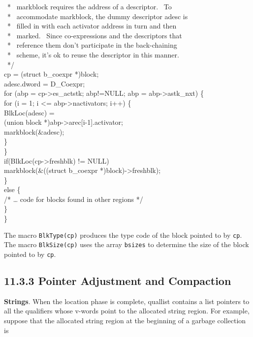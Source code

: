\begin{iconcode}
\>\>\ * \ markblock requires the address of a descriptor. \ To\\
\>\>\ * \ accommodate markblock, the dummy descriptor adesc is\\
\>\>\ * \ filled in with each activator address in turn and then\\
\>\>\ * \ marked. \ Since co-expressions and the descriptors that\\
\>\>\ * \ reference them don't participate in the back-chaining\\
\>\>\ * \ scheme, it's ok to reuse the descriptor in this manner.\\
\>\>\ */\\
\>\>cp = (struct b\_coexpr *)block;\\
\>\>adesc.dword = D\_Coexpr;\\
\>\>for (abp = cp->es\_actstk; abp!=NULL; abp = abp->astk\_nxt) \{\\
\>\>\>for (i = 1; i <= abp->nactivators; i++) \{\\
\>\>\>\>BlkLoc(adesc) =\\
\>\>\>\>\>(union block *)abp->arec[i-1].activator;\\
\>\>\>\>markblock(\&adesc);\\
\>\>\>\>\}\\
\>\>\>\}\\
\>\>if(BlkLoc(cp->freshblk) != NULL)\\
\>\>\>markblock(\&((struct b\_coexpr *)block)->freshblk);\\
\>\>\}\\
\>else \{\\
\>\>/* {\dots} code for blocks found in other regions */\\
\>\>\}\\
\>\}
\end{iconcode}

The macro \texttt{BlkType(cp)} produces the type code of the block
pointed to by \texttt{cp}. The macro \texttt{BlkSize(cp)} uses the
array \texttt{bsizes} to determine the size of the block pointed to by
\texttt{cp}.

\subsection[11.3.3 Pointer Adjustment and Compaction]{11.3.3 Pointer Adjustment and Compaction}

\textbf{Strings}. When the location phase is complete, quallist
contains a list pointers to all the qualifiers whose v-words point to
the allocated string region. For example, suppose that the allocated
string region at the beginning of a garbage collection is

